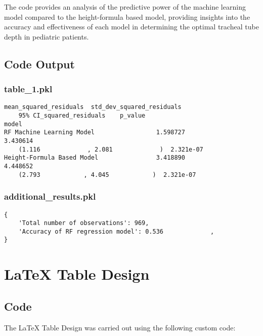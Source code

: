 \documentclass[11pt]{article}
\begin{document}
The code provides an analysis of the predictive power of the machine learning model compared to the height-formula based model, providing insights into the accuracy and effectiveness of each model in determining the optimal tracheal tube depth in pediatric patients.

\subsection{Code Output}

\subsubsection*{table\_1.pkl}

\begin{Verbatim}[tabsize=4]
                            mean_squared_residuals  std_dev_squared_residuals
	95% CI_squared_residuals    p_value
model
RF Machine Learning Model                 1.598727                   3.430614
	(1.116             , 2.081             )  2.321e-07
Height-Formula Based Model                3.418890                   4.448652
	(2.793            , 4.045            )  2.321e-07
\end{Verbatim}

\subsubsection*{additional\_results.pkl}

\begin{Verbatim}[tabsize=4]
{
    'Total number of observations': 969,
    'Accuracy of RF regression model': 0.536             ,
}
\end{Verbatim}

\section{LaTeX Table Design}
\subsection{{Code}}
The LaTeX Table Design was carried out using the following custom code:
\end{document}
